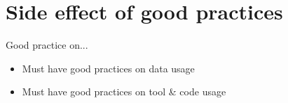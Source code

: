 \section{Side effect of good practices}
\begin{frame}
\begin{block}{Good practice on...}
\begin{itemize}
\item Must have good practices on data usage
\item Must have good practices on tool \& code usage
\end{itemize}
\end{block}
\end{frame}
\begin{frame}
\end{frame}

